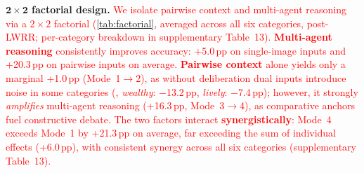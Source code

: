 \documentclass[runningheads]{llncs}
\begin{document}
\noindent\textbf{$\mathbf{2{\times}2}$ factorial design.}
\textcolor{red}{We isolate pairwise context and multi-agent reasoning via a $2{\times}2$ factorial (\cref{tab:factorial}, averaged across all six categories, post-LWRR; per-category breakdown in supplementary Table~13).
\textbf{Multi-agent reasoning} consistently improves accuracy: +5.0\,pp on single-image inputs and +20.3\,pp on pairwise inputs on average.
\textbf{Pairwise context} alone yields only a marginal +1.0\,pp (Mode~1$\to$2), as without deliberation dual inputs introduce noise in some categories (\eg, \emph{wealthy}: $-$13.2\,pp, \emph{lively}: $-$7.4\,pp); however, it strongly \emph{amplifies} multi-agent reasoning (+16.3\,pp, Mode~3$\to$4), as comparative anchors fuel constructive debate.
The two factors interact \textbf{synergistically}: Mode~4 exceeds Mode~1 by +21.3\,pp on average, far exceeding the sum of individual effects (+6.0\,pp), with consistent synergy across all six categories (supplementary Table~13).}
\end{document}
